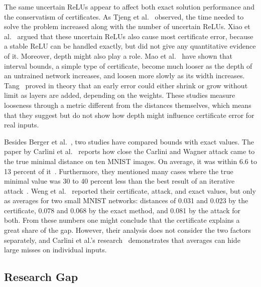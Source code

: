 The same uncertain ReLUs appear to affect both exact solution performance and the conservatism of
certificates. As Tjeng et al.~\cite[Sec.~5.2.1, p.~8]{MapSource12} observed, the time needed to
solve the problem increased along with the number of uncertain ReLUs. Xiao et al.~\cite[App.~F,
p.~20]{MapSource16} argued that these uncertain ReLUs also cause most certificate error, because a
stable ReLU can be handled exactly, but did not give any quantitative evidence of it. Moreover,
depth might also play a role. Mao et al.~\cite[Lemma~3.7, Cor.~3.8]{MapSource21} have shown that
interval bounds, a simple type of certificate, become much looser as the depth of an untrained
network increases, and loosen more slowly as its width increases. Tang~\cite[Prop.~3.4,
p.~12]{MapSource20} proved in theory that an early error could either shrink or grow without limit
as layers are added, depending on the weights. These studies measure looseness through a metric
different from the distances themselves, which means that they suggest but do not show how depth
might influence certificate error for real inputs.

Besides Berger et al.~\cite{Berger2026Upper}, two studies have compared bounds with exact values.
The paper by Carlini et al.~\cite{Carlini2017Provable} reports how close the Carlini and Wagner
attack came to the true minimal distance on ten MNIST images. On average, it was within 6.6 to 13
percent of it~\cite[Sec.~5, p.~6]{Carlini2017Provable}. Furthermore, they mentioned many cases where
the true minimal value was 30 to 40 percent less than the best result of an iterative
attack~\cite[Sec.~4.1, p.~5]{Carlini2017Provable}. Weng et al.~\cite[Tab.~1a, p.~8]{Weng2018FastLin}
reported their certificate, attack, and exact values, but only as averages for two small MNIST
networks: distances of 0.031 and 0.023 by the certificate, 0.078 and 0.068 by the exact method, and
0.081 by the attack for both. From these numbers one might conclude that the certificate explains a
great share of the gap. However, their analysis does not consider the two factors separately, and
Carlini et al.'s research~\cite{Carlini2017Provable} demonstrates that averages can hide large
misses on individual inputs.

\subsection{Research Gap}
\label{sec:lr-gap}

